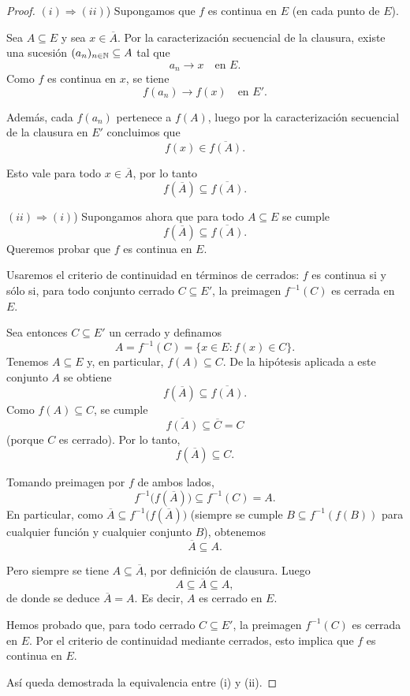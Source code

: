 \begin{proof}
$(i) \Rightarrow (ii)$) Supongamos que $f$ es continua en $E$
(en cada punto de $E$).

Sea $A \subseteq E$ y sea $x \in \overline{A}$. Por la caracterización
secuencial de la clausura, existe una sucesión $(a_n)_{n\in\mathbb{N}} \subseteq A$
tal que
\[
a_n \to x \quad \text{en } E.
\]
Como $f$ es continua en $x$, se tiene
\[
f(a_n) \to f(x) \quad \text{en } E'.
\]

Además, cada $f(a_n)$ pertenece a $f(A)$, luego por la caracterización
secuencial de la clausura en $E'$ concluimos que
\[
f(x) \in \overline{f(A)}.
\]

Esto vale para todo $x \in \overline{A}$, por lo tanto
\[
f(\overline{A}) \subseteq \overline{f(A)}.
\]

\medskip

$(ii) \Rightarrow (i)$) Supongamos ahora que para todo $A \subseteq E$
se cumple
\[
f(\overline{A}) \subseteq \overline{f(A)}.
\]
Queremos probar que $f$ es continua en $E$.

Usaremos el criterio de continuidad en términos de cerrados:
$f$ es continua si y sólo si, para todo conjunto cerrado
$C \subseteq E'$, la preimagen $f^{-1}(C)$ es cerrada en $E$.

Sea entonces $C \subseteq E'$ un cerrado y definamos
\[
A = f^{-1}(C) = \{x \in E : f(x) \in C\}.
\]
Tenemos $A \subseteq E$ y, en particular, $f(A) \subseteq C$.
De la hipótesis aplicada a este conjunto $A$ se obtiene
\[
f(\overline{A}) \subseteq \overline{f(A)}.
\]
Como $f(A) \subseteq C$, se cumple
\[
\overline{f(A)} \subseteq \overline{C} = C
\]
(porque $C$ es cerrado). Por lo tanto,
\[
f(\overline{A}) \subseteq C.
\]

Tomando preimagen por $f$ de ambos lados,
\[
f^{-1}\bigl(f(\overline{A})\bigr) \subseteq f^{-1}(C) = A.
\]
En particular, como $\overline{A} \subseteq f^{-1}\bigl(f(\overline{A})\bigr)$
(siempre se cumple $B \subseteq f^{-1}(f(B))$ para cualquier función y
cualquier conjunto $B$), obtenemos
\[
\overline{A} \subseteq A.
\]

Pero siempre se tiene $A \subseteq \overline{A}$, por definición de clausura.
Luego
\[
A \subseteq \overline{A} \subseteq A,
\]
de donde se deduce $\overline{A} = A$. Es decir, $A$ es cerrado en $E$.

Hemos probado que, para todo cerrado $C \subseteq E'$, la preimagen
$f^{-1}(C)$ es cerrada en $E$. Por el criterio de continuidad mediante
cerrados, esto implica que $f$ es continua en $E$.

Así queda demostrada la equivalencia entre (i) y (ii).
\end{proof}

